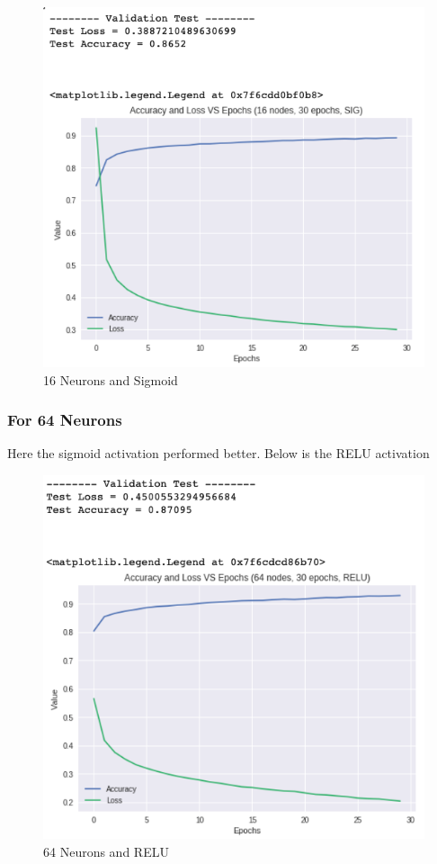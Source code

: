 \documentclass[a4paper, 12pt]{article}
\begin{document}
    \begin{figure}[h!]
        \centering
        \captionsetup{justification=centering}
        \includegraphics[scale = 0.3]{16_SIG.png}
        \caption{16 Neurons and Sigmoid}
    \end{figure}

    \subsubsection{For 64 Neurons}

    Here the sigmoid activation performed better. Below is the RELU activation

    \begin{figure}[h!]
        \centering
        \captionsetup{justification=centering}
        \includegraphics[scale = 0.3]{64_RELU.png}
        \caption{64 Neurons and RELU}
    \end{figure}
\end{document}
